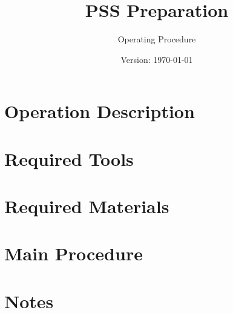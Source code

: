 \documentclass{article}
\title{PSS Preparation}
\author{Operating Procedure}
\date{Version: \isodate\today}
\begin{document}
\maketitle

\thispagestyle{fancy}

\renewcommand{\thesection}{\Alph{section}}

\section{Operation Description}


\section{Required Tools}


\section{Required Materials}


\newpage

\renewcommand{\thesection}{\arabic{section}}

\setcounter{section}{0}

\section{Main Procedure}


\newpage

\setcounter{section}{0}
\section*{Notes}

\end{document}
